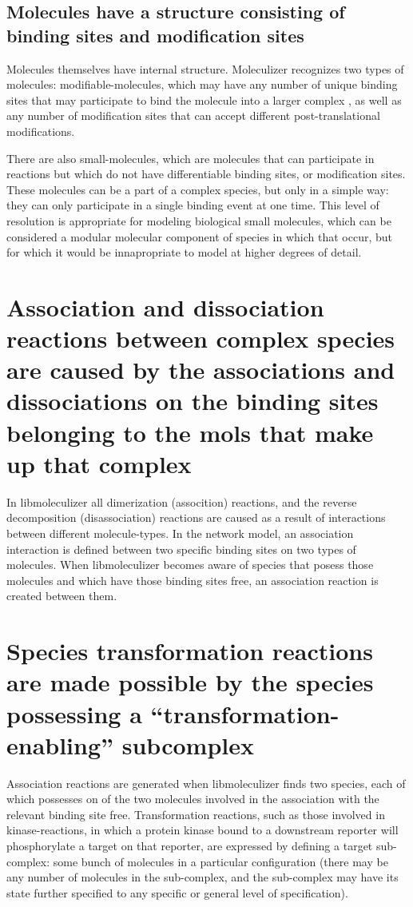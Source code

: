 \subsection{Molecules have a structure consisting of binding sites and
  modification sites}

Molecules themselves have internal structure.  Moleculizer recognizes
two types of molecules: modifiable-molecules, which may have any
number of unique binding sites that may participate to bind the
molecule into a larger complex , as well as any number of modification
sites that can accept different post-translational modifications.

There are also small-molecules, which are molecules that can
participate in reactions but which do not have differentiable binding
sites, or modification sites.  These molecules can be a part of a
complex species, but only in a simple way: they can only participate
in a single binding event at one time.  This level of resolution is
appropriate for modeling biological small molecules, which can be
considered a modular molecular component of species in which that
occur, but for which it would be innapropriate to model at higher
degrees of detail.


\section{Association and dissociation reactions between complex
  species are caused by the associations and dissociations on the
  binding sites belonging to the mols that make up that complex}

In libmoleculizer all dimerization (assocition) reactions, and the
reverse decomposition (disassociation) reactions are caused as a
result of interactions between different molecule-types.  In the
network model, an association interaction is defined between two
specific binding sites on two types of molecules.  When libmoleculizer
becomes aware of species that posess those molecules and which have
those binding sites free, an association reaction is created between
them.  
\section{Species transformation reactions are made possible by the
  species possessing a ``transformation-enabling'' subcomplex}
Association reactions are generated when libmoleculizer finds two
species, each of which possesses on of the two molecules involved in
the association with the relevant binding site free.  Transformation
reactions, such as those involved in kinase-reactions, in which a
protein kinase bound to a downstream reporter will phosphorylate a
target on that reporter, are expressed by defining a target
sub-complex: some bunch of molecules in a particular configuration
(there may be any number of molecules in the sub-complex, and the
sub-complex may have its state further specified to any specific or
general level of specification).  

